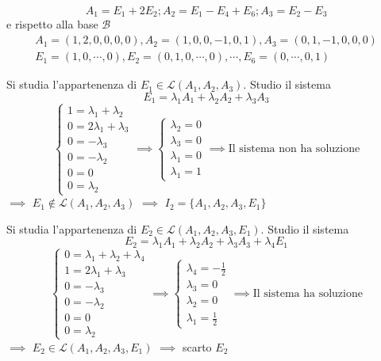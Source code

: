 \documentclass[twoside, 11pt, titlepage]{article}
\begin{document}
{\[
A_1=E_1+2E_2; A_2=E_1-E_4+E_6; A_3=E_2-E_3
\]
e rispetto alla base $\mathscr{B}$
\[\begin{gathered}
A_1=(1, 2, 0, 0, 0, 0), A_2=(1, 0, 0, -1, 0, 1), A_3=(0, 1, -1, 0, 0, 0)\\
E_1=(1, 0, \cdots, 0), E_2=(0, 1, 0, \cdots, 0), \cdots, E_6=(0, \cdots, 0, 1)
\end{gathered}\]

Si studia l'appartenenza di $E_1\in\mathscr{L}(A_1, A_2, A_3)$. Studio il sistema
\[
E_1=\lambda_1 A_1 + \lambda_2 A_2+ \lambda_3A_3
\]
\[
\begin{cases}
1=\lambda_1+\lambda_2\\
0=2\lambda_1+\lambda_3\\
0=-\lambda_3\\
0=-\lambda_2\\
0=0\\
0=\lambda_2
\end{cases}\implies \begin{cases}
\lambda_2=0\\
\lambda_3=0\\
\lambda_1=0\\
\lambda_1=1
\end{cases}\implies\text{Il sistema non ha soluzione}
\]$\implies$ $E_1\notin\mathscr{L}(A_1, A_2, A_3)$ $\implies$ $I_2=\{A_1, A_2, A_3, E_1\}$

Si studia l'appartenenza di $E_2\in\mathscr{L}(A_1, A_2, A_3, E_1)$. Studio il sistema
\[
E_2=\lambda_1 A_1 + \lambda_2 A_2+ \lambda_3A_3+\lambda_4E_1
\]
\[
\begin{cases}
0=\lambda_1+\lambda_2+\lambda_4\\
1=2\lambda_1+\lambda_3\\
0=-\lambda_3\\
0=-\lambda_2\\
0=0\\
0=\lambda_2
\end{cases}\implies \begin{cases}
\lambda_4=-\frac{1}{2}\\
\lambda_3=0\\
\lambda_2=0\\
\lambda_1=\frac{1}{2}
\end{cases}\implies\text{Il sistema ha soluzione}
\]$\implies$ $E_2\in\mathscr{L}(A_1, A_2, A_3, E_1)$ $\implies$ scarto $E_2$

}
\end{document}
